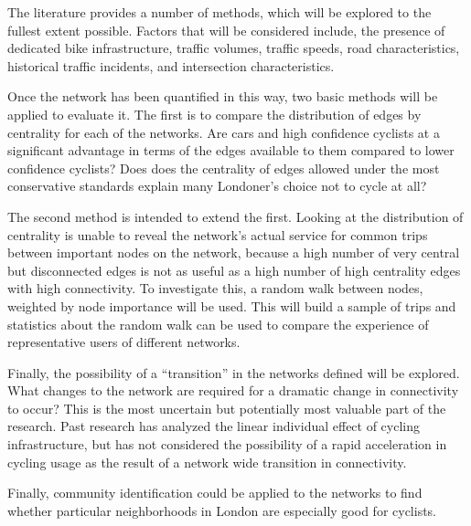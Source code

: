 The literature provides a number of methods, which will be explored to the fullest extent possible. Factors that will be considered include, the presence of dedicated bike infrastructure, traffic volumes, traffic speeds, road characteristics, historical traffic incidents, and intersection characteristics. 

Once the network has been quantified in this way, two basic methods will be applied to evaluate it. The first is to compare the distribution of edges by centrality for each of the networks. Are cars and high confidence cyclists at a significant advantage in terms of the edges available to them compared to lower confidence cyclists? Does does the centrality of edges allowed under the most conservative standards explain many Londoner's choice not to cycle at all? 

The second method is intended to extend the first. Looking at the distribution of centrality is unable to reveal the network's actual service for common trips between important nodes on the network, because a high number of very central but disconnected edges is not as useful as a high number of high centrality edges with high connectivity. To investigate this, a random walk between nodes, weighted by node importance will be used. This will build a sample of trips and statistics about the random walk can be used to compare the experience of representative users of different networks. 

Finally, the possibility of a ``transition'' in the networks defined will be explored. What changes to the network are required for a dramatic change in connectivity to occur? This is the most uncertain but potentially most valuable part of the research. Past research has analyzed the linear individual effect of cycling infrastructure, but has not considered the possibility of a rapid acceleration in cycling usage as the result of a network wide transition in connectivity. 

Finally, community identification could be applied to the networks to find whether particular neighborhoods in London are especially good for cyclists. 